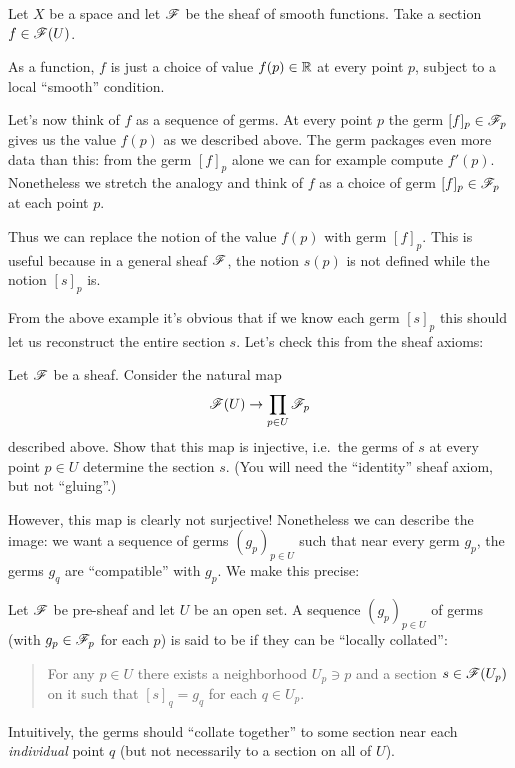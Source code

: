 \begin{example}
	Let $X$ be a space and let $\mathscr F$ be the sheaf of smooth functions.
	Take a section $f \in \mathscr F(U)$.
	\begin{itemize}
		\ii As a function, $f$ is just a choice of value $f(p) \in \mathbb R$ at
		every point $p$, subject to a local ``smooth'' condition.

		\ii Let's now think of $f$ as a sequence of germs.
		At every point $p$ the germ $[f]_p \in \mathscr F_p$ gives us the value $f(p)$
		as we described above. The germ packages even more data than this:
		from the germ $[f]_p$ alone we can for example compute $f'(p)$.
		Nonetheless we stretch the analogy and think of $f$
		as a choice of germ $[f]_p \in \mathscr F_p$ at each point $p$.
	\end{itemize}
	Thus we can replace the notion of the value $f(p)$ with germ $[f]_p$.
	This is useful because in a general sheaf $\mathscr F$, the notion $s(p)$
	is not defined while the notion $[s]_p$ is.
\end{example}


From the above example it's obvious that if we know each germ $[s]_p$
this should let us reconstruct the entire section $s$.
Let's check this from the sheaf axioms:
\begin{exercise}
	Let $\mathscr F$ be a sheaf.
	Consider the natural map 
	\[ \mathscr F(U) \to \prod_{p \in U} \mathscr F_p \]
	described above.
	Show that this map is injective, i.e.\
	the germs of $s$ at every point $p \in U$ determine the section $s$.
	(You will need the ``identity'' sheaf axiom, but not ``gluing''.)
\end{exercise}

However, this map is clearly not surjective!
Nonetheless we can describe the image:
we want a sequence of germs $(g_p)_{p \in U}$ such that near every germ $g_p$,
the germs $g_q$ are ``compatible'' with $g_p$.
We make this precise:
\begin{definition}
	Let $\mathscr F$ be pre-sheaf and let $U$ be an open set.
	A sequence $(g_p)_{p \in U}$ of germs
	(with $g_p \in \mathscr F_p$ for each $p$)
	is said to be  if
	they can be ``locally collated'':
	\begin{quote}
		For any $p \in U$ there exists a neighborhood $U_p \ni p$
		and a section $s \in \mathscr F(U_p)$ on it
		such that $[s]_q = g_q$ for each $q \in U_p$.
	\end{quote}
	Intuitively, the germs should ``collate together'' to some section near
	each \emph{individual} point $q$
	(but not necessarily to a section on all of $U$).
\end{definition}

